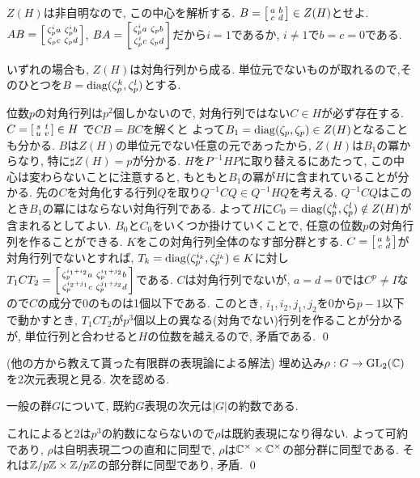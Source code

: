 \begin{egans}
$Z(H)$は非自明なので, この中心を解析する. $B=\left[\begin{smallmatrix}a&b\\c&d\end{smallmatrix}\right]\in Z(H)$とせよ.
$AB = \left[\begin{smallmatrix}\zeta_p^i a& \zeta_p^i b\\ \zeta_p c & \zeta_p d\end{smallmatrix}\right]$, $BA = \left[\begin{smallmatrix}\zeta_p^i a & \zeta_p b \\ \zeta_p^i c & \zeta_p d\end{smallmatrix}\right]$だから$i=1$であるか, $i\neq 1$で$b=c=0$である. \par
いずれの場合も, $Z(H)$は対角行列から成る. 単位元でないものが取れるので,そのひとつを$B = \mathrm{diag}(\zeta_p^{k}, \zeta_p^{l})$とする. \par
位数$p$の対角行列は$p^2$個しかないので, 対角行列ではない$C\in H$が必ず存在する.  $C=\left[\begin{smallmatrix}s&t\\ u&v\end{smallmatrix}\right]\in H$ で$CB = BC$を解くと よって$B_1=\mathrm{diag}(\zeta_p,\zeta_p) \in Z(H)$となることも分かる. $B$は$Z(H)$の単位元でない任意の元であったから, $Z(H)$は$B_1$の冪からなり, 特に$\sharp Z(H) = p$が分かる. $H$を$P^{-1}HP$に取り替えるにあたって, この中心は変わらないことに注意すると, もともと$B_1$の冪が$H$に含まれていることが分かる. 先の$C$を対角化する行列$Q$を取り$Q^{-1}CQ\in Q^{-1}HQ$を考える. $Q^{-1}CQ$はこのとき$B_1$の冪にはならない対角行列である. よって$H$に$C_0=\mathrm{diag}(\zeta_p^{k}, \zeta_{p}^{l})\notin Z(H)$が含まれるとしてよい. $B_0$と$C_0$をいくつか掛けていくことで, 任意の位数$p$の対角行列を作ることができる. $K$をこの対角行列全体のなす部分群とする. $C = \left[\begin{smallmatrix}a&b\\ c&d\end{smallmatrix}\right]$が対角行列でないとすれば, $T_{k}=\mathrm{diag}(\zeta_p^{i_k}, \zeta_p^{j_k})\in K$に対し$T_{1}CT_{2} = \left[\begin{smallmatrix}\zeta_{p}^{i_1+i_2}a & \zeta_{p}^{i_1+j_2}b \\ \zeta_{p}^{i_2+j_1}c & \zeta_{p}^{j_1+j_2}d\end{smallmatrix}\right]$である. $C$は対角行列でないが, $a=d=0$では$C^p \neq I$なので$C$の成分で0のものは1個以下である. このとき, $i_1,i_2,j_1,j_2$を$0$から$p-1$以下で動かすとき, $T_1CT_2$が$p^3$個以上の異なる(対角でない)行列を作ることが分かるが, 単位行列と合わせると$H$の位数を越えるので, 矛盾である. \qed
\end{egans}

\begin{egans} (他の方から教えて貰った有限群の表現論による解法)
埋め込み$\rho:G\to \mathrm{GL}_{2}(\mathbb{C})$を2次元表現と見る. 次を認める.
\begin{prop}
一般の群$G$について, 既約$G$表現の次元は$|G|$の約数である.
\end{prop}
これによると$2$は$p^3$の約数にならないので$\rho$は既約表現になり得ない. よって可約であり, $\rho$は自明表現二つの直和に同型で, $\rho$は$\mathbb{C}^{\times}\times \mathbb{C}^{\times}$の部分群に同型である. それは$\mathbb{Z}/p\mathbb{Z}\times \mathbb{Z}/p\mathbb{Z}$の部分群に同型であり, 矛盾. \qed

\end{egans}

